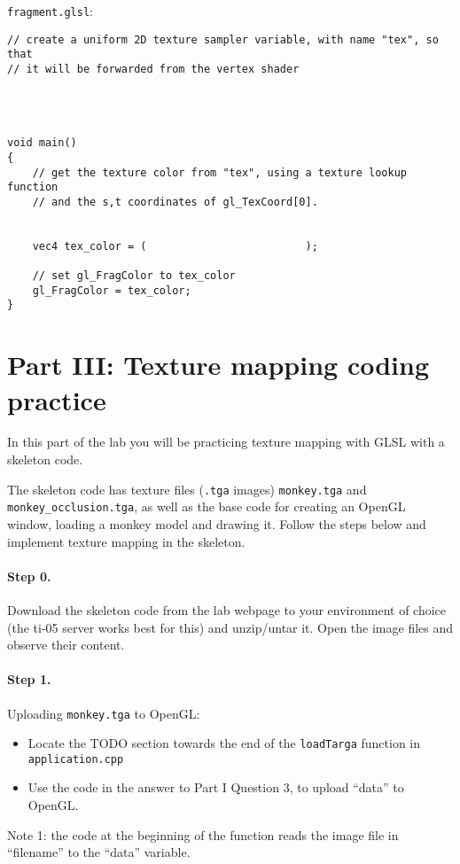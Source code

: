 \documentclass[12pt]{article}
\begin{document}
\texttt{fragment.glsl}:

\begin{lstlisting}
// create a uniform 2D texture sampler variable, with name "tex", so that 
// it will be forwarded from the vertex shader


 

void main()
{
    // get the texture color from "tex", using a texture lookup function 
    // and the s,t coordinates of gl_TexCoord[0].
    

    vec4 tex_color = (                         );

    // set gl_FragColor to tex_color
    gl_FragColor = tex_color;
}
\end{lstlisting}

\section*{Part III: Texture mapping coding practice}

In this part of the lab you will be practicing texture mapping with GLSL with a skeleton
code.

The skeleton code has texture files (\texttt{.tga} images) \texttt{monkey.tga}
and \texttt{monkey\_occlusion.tga}, as well as the base code for creating an
OpenGL window, loading a monkey model and drawing it.  Follow the steps below
and implement texture mapping in the skeleton.

\paragraph*{Step 0.} Download the skeleton code from the lab webpage to your environment of choice (the ti-05 server works best for this) and unzip/untar it. Open the image files and observe their
content.

\paragraph*{Step 1.} Uploading \texttt{monkey.tga} to OpenGL:

\begin{itemize}
\item Locate the TODO section towards the end of the \texttt{loadTarga} function
  in \texttt{application.cpp}
\item Use the code in the answer to Part I Question 3, to upload ``data'' to
  OpenGL.
\end{itemize}

Note 1: the code at the beginning of the function reads the image file in
``filename'' to the ``data'' variable.
\end{document}
